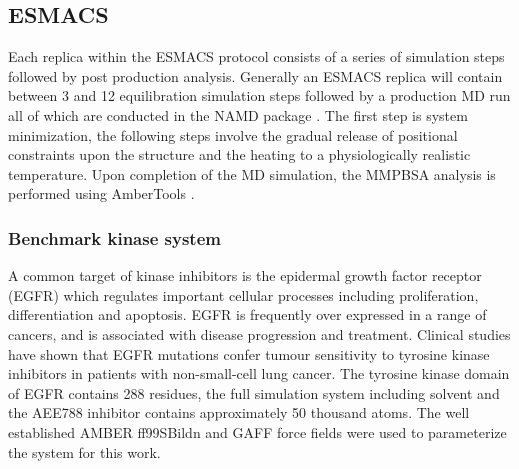 \subsection{ESMACS}

Each replica within the ESMACS protocol consists of a series of simulation steps followed by post production analysis.
Generally an ESMACS replica will contain between 3 and 12 equilibration simulation steps followed by a production MD run all of which are conducted in the NAMD package \cite{Phillips2005}.
The first step is system minimization, the following steps involve the gradual release of positional constraints upon the structure and the heating to a physiologically realistic temperature.
Upon completion of the MD simulation, the MMPBSA analysis is performed using AmberTools \cite{amber14, Case2005, MillerIII2012}.

\subsubsection{Benchmark kinase system}

A common target of kinase inhibitors is the epidermal growth factor receptor (EGFR) which regulates important cellular processes including proliferation, differentiation and apoptosis.
EGFR is frequently over expressed in a range of cancers, and is associated with disease progression and treatment. 
Clinical studies have shown that EGFR mutations confer tumour sensitivity to tyrosine kinase inhibitors in patients with non-small-cell lung cancer.
The tyrosine kinase domain of EGFR contains 288 residues, the full simulation system including solvent and the AEE788 inhibitor contains approximately 50 thousand atoms.
The well established AMBER ff99SBildn and GAFF force fields \cite{Maier2015, Wang2004} were used to parameterize the system for this work.